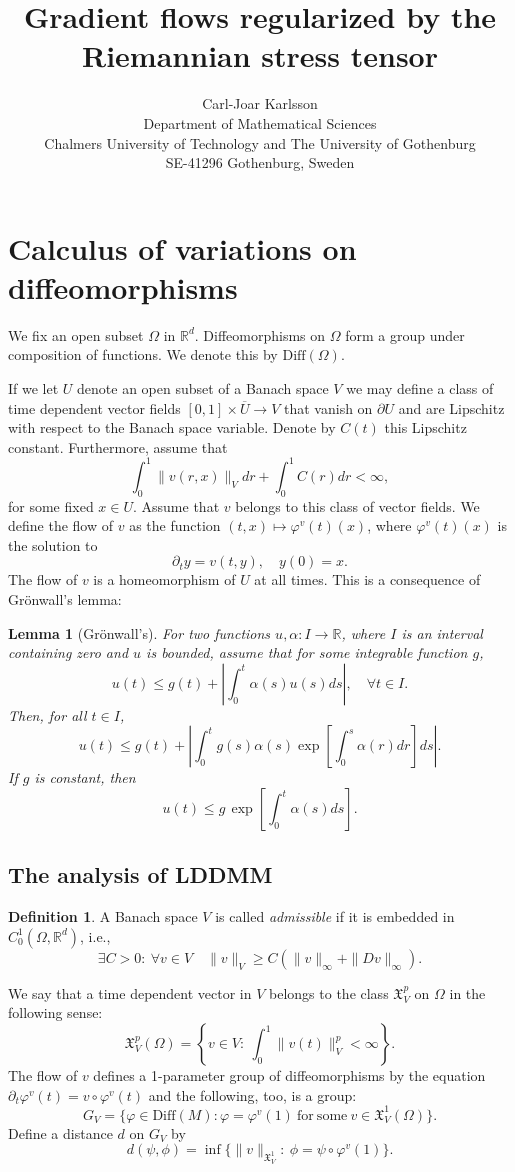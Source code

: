 \documentclass[a5paper,11pt,twoside]{article}
\title{Gradient flows regularized by the Riemannian stress tensor}
\author{Carl-Joar Karlsson  \\ 
	\small Department of Mathematical Sciences \\
	\small Chalmers University of Technology and The University of Gothenburg\\
	\small SE-41296 Gothenburg, Sweden}
\theoremstyle{plain}
\newtheorem{lem}[teo]{Lemma}
\newcommand{\R}{\ensuremath{\mathbb{R}}}
\newcommand{\X}{\ensuremath{\mathfrak{X}}}
\newcommand{\Diff}{\ensuremath{\mathrm{Diff}}}
\theoremstyle{definition}
\newtheorem{defin}[teo]{Definition}
\begin{document}
\maketitle
\thispagestyle{empty}
\setcounter{page}{0}

\section[Calculus of variations]{Calculus of variations on diffeomorphisms}
We fix an open subset $\Omega$ in $\R^d$. Diffeomorphisms on $\Omega$ form a group under composition of functions. We denote this by $\Diff(\Omega)$.

If we let $U$ denote an open subset of a Banach space $V$ we may define a class of time dependent vector fields $[0,1]\times \overline{U}\to V$ that vanish on $\partial U$ and are Lipschitz with respect to the Banach space variable. Denote by $C(t)$ this Lipschitz constant. Furthermore, assume that
\[
\int_0^1\|v(r,x)\|_Vdr+\int_0^1 C(r)dr<\infty,
\]
for some fixed $x\in U$. Assume that $v$ belongs to this class of vector fields. We define the flow of $v$ as the function $(t,x)\mapsto\varphi^v(t)(x)$, where $\varphi^v(t)(x)$ is the solution to 
\[ \partial_t y=v(t,y),\quad y(0)=x. \]
The flow of $v$ is a homeomorphism of $U$ at all times. This is a consequence of Grönwall's lemma:

\begin{lem}[Grönwall's]
\label{gronwalls}
For two functions $u,\alpha:I\to \R$, where $I$ is an interval containing zero and $u$ is bounded, assume that for some integrable function $g$,
\[
u(t)\leq g(t)+\left|\int_0^t\alpha(s)u(s)ds\right|,\quad \forall t\in I.
\]
Then, for all $t\in I$,
\[
u(t)\leq g(t)+\left|\int_0^t g(s)\alpha(s)\exp[\int_0^s\alpha(r)dr]ds\right|.
\]
If $g$ is constant, then
\[
u(t)\leq g\,\exp\left[\int_0^t\alpha(s)ds\right].
\]
\end{lem}

\subsection{The analysis of LDDMM}

\begin{defin}
	A Banach space $V$ is called \textit{admissible} if it is embedded in $C_0^1(\Omega,\R^d)$, i.e., 
	\[
	\exists C>0: \ \forall v\in V\quad \|v\|_V\geq C(\|v\|_\infty+\|Dv\|_\infty).
	\]
\end{defin}

We say that a time dependent vector in $V$ belongs to the class $\X_V^p$ on $\Omega$ in the following sense:
\[
\X_V^p(\Omega)=\left\{v\in V:\ \int_0^1\|v(t)\|_V^p<\infty\right\}.
\]
The flow of $v$ defines a 1-parameter group of diffeomorphisms by the equation $\partial_t\varphi^v(t)=v\circ\varphi^v(t)$ and the following, too, is a group:
\[
G_V=\{\varphi\in \Diff(M): \varphi=\varphi^v(1)\ \mathrm{for\ some\ } v\in\X_V^1(\Omega)\}.
\]
Define a distance $d$ on $G_V$ by
\[
d(\psi,\phi)=\inf\{\|v\|_{\X_V^1}:\ \phi=\psi\circ\varphi^v(1)\}.
\]
\end{document}
